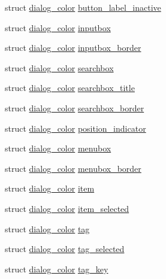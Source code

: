 \begin{DoxyCompactItemize}
\item 
struct \hyperlink{structdialog__color}{dialog\-\_\-color} \hyperlink{structdialog__info_acbe2e017c496b7e676c33d4d92cd056b}{button\-\_\-label\-\_\-inactive}
\item 
struct \hyperlink{structdialog__color}{dialog\-\_\-color} \hyperlink{structdialog__info_addbd87e943da6bb0040fa62a45abd0ed}{inputbox}
\item 
struct \hyperlink{structdialog__color}{dialog\-\_\-color} \hyperlink{structdialog__info_a6f71cf10f00154ddb7485b217d92f8a7}{inputbox\-\_\-border}
\item 
struct \hyperlink{structdialog__color}{dialog\-\_\-color} \hyperlink{structdialog__info_a494700ebb921a252456b47c6f6bc3e46}{searchbox}
\item 
struct \hyperlink{structdialog__color}{dialog\-\_\-color} \hyperlink{structdialog__info_af22e65ea0d4c967555529436af2281a1}{searchbox\-\_\-title}
\item 
struct \hyperlink{structdialog__color}{dialog\-\_\-color} \hyperlink{structdialog__info_af26d5256e0a31a0611b6a859618d9f37}{searchbox\-\_\-border}
\item 
struct \hyperlink{structdialog__color}{dialog\-\_\-color} \hyperlink{structdialog__info_ad70e3f5a5f954e175e2c90342aff80f9}{position\-\_\-indicator}
\item 
struct \hyperlink{structdialog__color}{dialog\-\_\-color} \hyperlink{structdialog__info_a98a8ea98203fba503d3e931f91e62960}{menubox}
\item 
struct \hyperlink{structdialog__color}{dialog\-\_\-color} \hyperlink{structdialog__info_a1b846f8eb174d52baf6ad1e6f1ba4f7c}{menubox\-\_\-border}
\item 
struct \hyperlink{structdialog__color}{dialog\-\_\-color} \hyperlink{structdialog__info_acbc81039e9485672d07965f49388505d}{item}
\item 
struct \hyperlink{structdialog__color}{dialog\-\_\-color} \hyperlink{structdialog__info_a24ab0dbd101655e03f7f07cde0e5ff38}{item\-\_\-selected}
\item 
struct \hyperlink{structdialog__color}{dialog\-\_\-color} \hyperlink{structdialog__info_a18588fc18a98f029a6ebb70f961c00cb}{tag}
\item 
struct \hyperlink{structdialog__color}{dialog\-\_\-color} \hyperlink{structdialog__info_ab888320078b48b63299a74e8fa42f683}{tag\-\_\-selected}
\item 
struct \hyperlink{structdialog__color}{dialog\-\_\-color} \hyperlink{structdialog__info_a7393a79c9edb129d5c8c1281e78e11fc}{tag\-\_\-key}

\end{DoxyCompactItemize}

